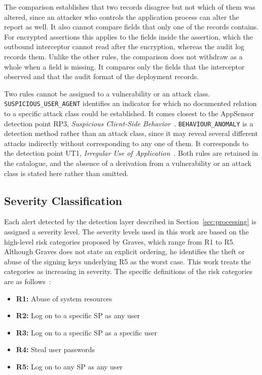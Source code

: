 \documentclass[../main.tex]{subfiles}
\begin{document}
The comparison establishes that two records disagree but not which of them was altered, since an 
attacker who controls the application process can alter the report as well. 
It also cannot compare fields that only one of the records contains. 
For encrypted assertions this applies to the fields inside the assertion, which the outbound 
interceptor cannot read after the encryption, whereas the audit log records them. 
Unlike the other rules, the comparison does not withdraw as a whole when a field is missing. 
It compares only the fields that the interceptor observed and that the audit format of the 
deployment records. 

Two rules cannot be assigned to a vulnerability or an attack class. 
\texttt{SUSPICIOUS\_\allowbreak{}USER\_\allowbreak{}AGENT} identifies an indicator for which no documented relation to a specific attack 
class could be established. 
It comes closest to the AppSensor detection point RP3, \textit{Suspicious Client-Side Behavior}~\cite{OWASPAppSensor}. 
\texttt{BEHAVIOUR\_\allowbreak{}ANOMALY} is a detection method rather than an attack class, since it may reveal several 
different attacks indirectly without corresponding to any one of them. 
It corresponds to the detection point UT1, \textit{Irregular Use of Application}~\cite{OWASPAppSensor}. 
Both rules are retained in the catalogue, and the absence of a derivation from a vulnerability or 
an attack class is stated here rather than omitted. 

\subsection{Severity Classification}\label{subsec:severity}

Each alert detected by the detection layer described in Section~\ref{sec:processing} is assigned 
a severity level.
The severity levels used in this work are based on the high-level risk categories proposed by 
Graves, which range from R1 to R5. 
Although Graves does not state an explicit ordering, he identifies the theft or abuse of the 
signing keys underlying R5 as the worst case. 
This work treats the categories as increasing in severity. 
The specific definitions of the risk categories are as follows~\cite{ShibbolethGIAC}:

\begin{itemize}
\item \textbf{R1:} Abuse of system resources
\item \textbf{R2:} Log on to a specific SP as any user
\item \textbf{R3:} Log on to a specific SP as a specific user
\item \textbf{R4:} Steal user passwords
\item \textbf{R5:} Log on to any SP as any user
\end{itemize}
\end{document}
